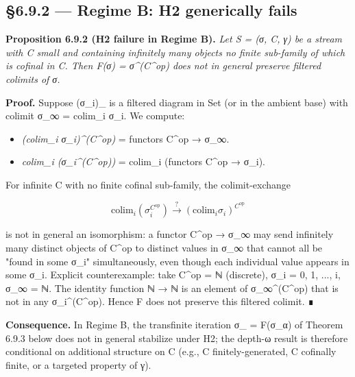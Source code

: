\documentclass[11pt, openany]{book}
\begin{document}
\subsection{§6.9.2 --- Regime B: H2 generically fails}

\textbf{Proposition 6.9.2 (H2 failure in Regime B).} \textit{Let S = (σ, C, γ) be a stream with C small and containing infinitely many objects no finite sub-family of which is cofinal in C. Then F(σ) = σ\textasciicircum{}(C\textasciicircum{}op) does not in general preserve filtered colimits of σ.}

\textbf{Proof.} Suppose (σ\_\allowbreak{}i)\_ is a filtered diagram in Set (or in the ambient base) with colimit σ\_\allowbreak{}∞ = colim\_\allowbreak{}i σ\_\allowbreak{}i. We compute:

\begin{itemize}
\item \textit{(colim\_\allowbreak{}i σ\_\allowbreak{}i)\textasciicircum{}(C\textasciicircum{}op)} = functors C\textasciicircum{}op → σ\_\allowbreak{}∞.
\item \textit{colim\_\allowbreak{}i (σ\_\allowbreak{}i\textasciicircum{}(C\textasciicircum{}op))} = colim\_\allowbreak{}i (functors C\textasciicircum{}op → σ\_\allowbreak{}i).
\end{itemize}

For infinite C with no finite cofinal sub-family, the colimit-exchange

$$\mathrm{colim}_i (\sigma_i^{C^{\mathrm{op}}}) \xrightarrow{?} (\mathrm{colim}_i \sigma_i)^{C^{\mathrm{op}}}$$

is not in general an isomorphism: a functor C\textasciicircum{}op → σ\_\allowbreak{}∞ may send infinitely many distinct objects of C\textasciicircum{}op to distinct values in σ\_\allowbreak{}∞ that cannot all be "found in some σ\_\allowbreak{}i" simultaneously, even though each individual value appears in some σ\_\allowbreak{}i. Explicit counterexample: take C\textasciicircum{}op = ℕ (discrete), σ\_\allowbreak{}i = {0, 1, ..., i}, σ\_\allowbreak{}∞ = ℕ. The identity function ℕ → ℕ is an element of σ\_\allowbreak{}∞\textasciicircum{}(C\textasciicircum{}op) that is not in any σ\_\allowbreak{}i\textasciicircum{}(C\textasciicircum{}op). Hence F does not preserve this filtered colimit. ∎

\textbf{Consequence.} In Regime B, the transfinite iteration σ\_ = F(σ\_\allowbreak{}α) of Theorem 6.9.3 below does not in general stabilize under H2; the depth-ω result is therefore conditional on additional structure on C (e.g., C finitely-generated, C cofinally finite, or a targeted property of γ).
\end{document}
